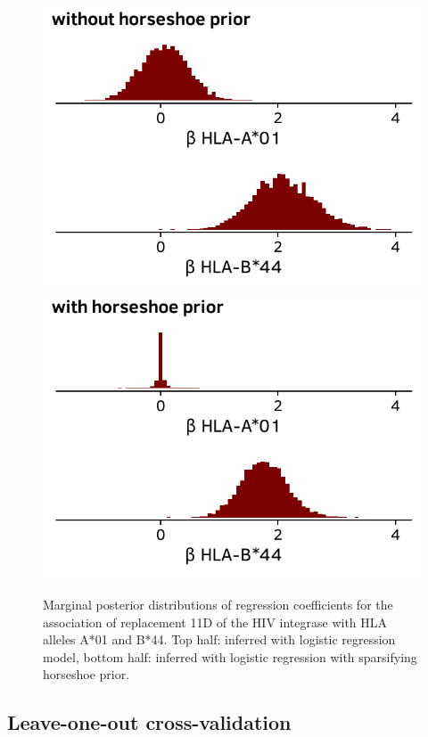 \documentclass{bioinfo}
\begin{document}
\begin{figure}
  \includegraphics[width=1\linewidth]{plots/without_horseshoe.pdf}
  \includegraphics[width=1\linewidth]{plots/with_horseshoe.pdf}
  \caption{Marginal posterior distributions of regression coefficients for the association of replacement 11D of the HIV integrase with HLA alleles A*01 and B*44. Top half: inferred with logistic regression model, bottom half: inferred with logistic regression with sparsifying horseshoe prior.}
  \label{fig:horseshoe-comparison}
\end{figure}


\subsection{Leave-one-out cross-validation}
\end{document}
